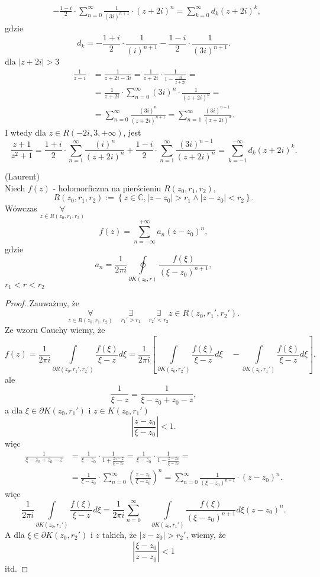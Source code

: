\documentclass[../main.tex]{subfiles}
\begin{document}
\begin{przyklad}
\begin{align*}
    &- \frac{1-i}{2}\cdot \sum_{n=0}^{\infty} \frac{1}{(3i)^{n+1}}\cdot (z+2i)^n = \sum_{k = 0}^{\infty}d_k \left( z+2i \right) ^k
,\end{align*}
gdzie
\[
    d_k = -\frac{1+i}{2}\cdot \frac{1}{(i)^{n+1}} - \frac{1-i}{2}\cdot \frac{1}{(3i)^{n+1}}
.\]
dla $|z+2i| > 3$
\begin{align*}
    \frac{1}{z-i} &= \frac{1}{z+2i-3i} = \frac{1}{z+2i}\cdot \frac{1}{1 - \frac{3i}{z+2i}} =\\
    &= \frac{1}{z+2i}\cdot \sum_{n=0}^{\infty} (3i)^n\cdot \frac{1}{(z+2i)^n} =\\
    &= \sum_{n=0}^{\infty} \frac{(3i)^n}{(z+2i)^{n+1}} = \sum_{n=1}^{\infty} \frac{(3i)^{n-1}}{(z+2i)^n}
.\end{align*}
I wtedy dla $z\in R(-2i,3,+\infty)$, jest
\[
    \frac{z+1}{z^2+1} = \frac{1+i}{2} \cdot \sum_{n=1}^{\infty} \frac{(i)^n}{(z+2i)^n} + \frac{1-i}{2}\cdot \sum_{n=1}^{\infty} \frac{(3i)^{n-1}}{(z+2i)^n} = \sum_{k=-1}^{-\infty} d_k (z+2i)^k
.\]
\end{przyklad}
\begin{tw}
    (Laurent)\\
    Niech $f(z)$ - holomorficzna na pierścieniu $R(z_0,r_1,r_2)$,
    \[
        R(z_0,r_1,r_2) := \left\{ z\in\mathbb{C}, |z-z_0|>r_1 \land |z-z_0| < r_2 \right\}
    .\]
Wówczas $\underset{z\in R(z_0,r_1,r_2)}{\forall} $
\[
    f(z) = \sum_{n=-\infty}^{+\infty} a_n(z-z_0)^n
,\]
gdzie
\[
    a_n = \frac{1}{2\pi i} \oint\limits_{\partial K(z_0,r)} \frac{f(\xi)}{(\xi - z_0)^{n+1}}
,\]
$r_1<r<r_2$
\end{tw}
\begin{proof}
    Zauważmy, że
        \[
            \underset{z\in R(z_0,r_1,r_2)}{\forall}\quad \underset{r_1' > r_1}{\exists}\quad \underset{r_2' < r_2}{\exists} z\in R(z_0,r_1',r_2').
        \]
        Ze wzoru Cauchy wiemy, że
        \[
            f(z) = \frac{1}{2\pi i } \int\limits_{\partial R(z_0,r_1',r_2')}\frac{f(\xi)}{\xi-z}d\xi = \frac{1}{2\pi i}\left[\int\limits_{\partial K(z_0,r_2')}\frac{f(\xi)}{\xi - z}d\xi \quad- \int\limits_{\partial K(z_0,r_1')} \frac{f(\xi)}{\xi - z}d\xi\right]
        .\]
    ale
    \[
    \frac{1}{\xi - z} = \frac{1}{\xi - z_0 + z_0 - z}
    ,\]
a dla $\xi \in \partial K (z_0,r_1')$ i $z\in K(z_0,r_1')$
\[
    \left|\frac{z-z_0}{\xi-z_0}\right| < 1
.\]
więc
\begin{align*}
    \frac{1}{\xi - z_0 + z_0 - z} &= \frac{1}{\xi - z_0}\cdot \frac{1}{1 + \frac{z_0 - z}{\xi - z_0}} = \frac{1}{\xi - z_0}\cdot \frac{1}{1 - \frac{z-z_0}{\xi - z_0}} =\\
    &=\frac{1}{\xi - z_0}\cdot \sum_{n=0}^{\infty} \left(\frac{z-z_0}{\xi - z_0}\right)^n = \sum_{n=0}^{\infty} \frac{1}{(\xi - z_0)^{n+1}}\cdot (z-z_0)^n
.\end{align*}
więc
\[
    \frac{1}{2 \pi i}\int\limits_{\partial K(z_0,r_1')}\frac{f(\xi)}{\xi - z}d\xi = \frac{1}{2\pi i} \sum_{n=0}^{\infty}\quad \int\limits_{\partial K(z_0,r_1')}\frac{f(\xi)}{(\xi - z_0)^{n+1}}d\xi (z-z_0)^n
    .\]
A dla $\xi\in\partial K(z_0,r_2')$ i $z$ takich, że $|z - z_0| > r_2'$, wiemy, że
\[
    \left|\frac{\xi - z_0}{z - z_0}\right| < 1
\]
itd.
\end{proof}
\end{document}
